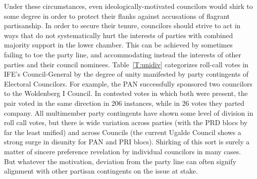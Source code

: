 \documentclass[12 pt]{article}
\begin{document}
Under these circumstances, even ideologically-motivated councilors would shirk to some degree in order to protect their flanks against accusations of flagrant partisanship.  In order to secure their tenure, councilors should strive to act in ways that do not systematically hurt the interests of parties with combined majority support in the lower chamber.  This can be achieved by sometimes failing to toe the party line, and accommodating instead the interests of other parties and their council nominees.  Table~\ref{T:unidiv} categorizes roll-call votes in IFE's Council-General by the degree of unity manifested by party contingents of Electoral Councilors.  For example, the PAN successfully sponsored two councilors to the Woldenberg I Council.  In contested votes in which both were present, the pair voted in the same direction in 206 instances, while in 26 votes they parted company.  All multimember party contingents have shown some level of division in roll call votes, but there is wide variation across parties (with the PRD blocs by far the least unified) and across Councils (the current Ugalde Council shows a strong surge in disunity for PAN and PRI blocs).  Shirking of this sort is surely a matter of sincere preference revelation by individual councilors in many cases.  But whatever the motivation, deviation from the party line can often signify alignment with other partisan contingents on the issue at stake.
\end{document}
